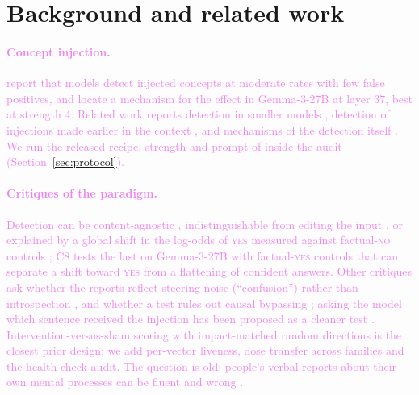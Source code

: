\documentclass[11pt,a4paper]{article}
\newcommand{\yes}{\textup{\textsc{yes}}}
\newcommand{\no}{\textup{\textsc{no}}}
\newcommand{\draft}[1]{\textcolor{violet}{#1}}
\begin{document}
\section{Background and related work}
\label{sec:related}
\draft{\paragraph{Concept injection.} \citet{lindsey2025introspection} report that models detect
injected concepts at moderate rates with few false positives, and \citet{macar2026mechanisms}
locate a mechanism for the effect in Gemma-3-27B at layer 37, best at strength 4. Related work
reports detection in smaller models \citep{vogel2025small}, detection of injections made earlier in
the context \citep{pearsonvogel2026latent}, and mechanisms of the detection itself
\citep{zou2026mechanistic}. We run the released recipe, strength and prompt of
\citet{macar2026mechanisms} inside the audit (Section~\ref{sec:protocol}).}

\draft{\paragraph{Critiques of the paradigm.} Detection can be content-agnostic
\citep{lederman2026contentagnostic}, indistinguishable from editing the input
\citep{singh2026realitycheck}, or explained by a global shift in the log-odds of \yes{} measured
against factual-\no{} controls \citep{hahami2025disturbance}; C8 tests the last on Gemma-3-27B with
factual-\yes{} controls that can separate a shift toward \yes{} from a flattening of confident
answers. Other critiques ask whether the reports reflect steering noise (``confusion'') rather than
introspection \citep{godet2025confusion}, and whether a test rules out causal bypassing
\citep{morris2025bypassing}; asking the model which sentence received the injection has been
proposed as a cleaner test \citep{godet2025localization,hahami2025disturbance}. Intervention-versus-sham scoring with impact-matched random
directions \citep{ferrara2026masked} is the closest prior design; we add per-vector liveness, dose
transfer across families and the health-check audit. The question is old: people's verbal reports
about their own mental processes can be fluent and wrong \citep{nisbett1977telling}.}
\end{document}
